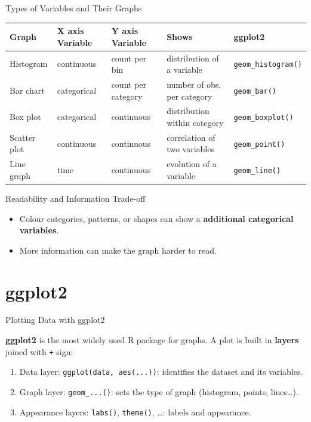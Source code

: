 \documentclass[9pt,aspectratio=169]{beamer}
\begin{document}
\begin{frame}{Types of Variables and Their Graphs}

\begin{center}
\footnotesize
\begin{tabular}{lllll}
\toprule
\textbf{Graph} & \textbf{X axis Variable} & \textbf{Y axis Variable} & \textbf{Shows} & \textbf{ggplot2} \\
\midrule
Histogram    & continuous & count per bin      & distribution of a variable          & \texttt{geom\_histogram()} \\
Bar chart    & categorical         & count per category & number of obs. per category & \texttt{geom\_bar()} \\
Box plot     & categorical         & continuous         & distribution within category   & \texttt{geom\_boxplot()} \\
Scatter plot & continuous          & continuous         & correlation of two variables   & \texttt{geom\_point()} \\
Line graph   & time                & continuous         & evolution of a variable   & \texttt{geom\_line()} \\
\bottomrule
\end{tabular}
\end{center}
\pause
\vspace{0.3cm}
\begin{block}{Readability and Information Trade-off}
  \begin{itemize}
    \item Colour categories, patterns, or shapes can show a \textbf{additional categorical variables}.
    \item More information can make the graph harder to read.
  \end{itemize}
\end{block}
\end{frame}


\section{ggplot2}

\begin{frame}[fragile]{Plotting Data with ggplot2}
\linespread{1.2}\selectfont

\textbf{ggplot2} is the most widely used R package for graphs. A plot is built in \textbf{layers} joined with \texttt{+} sign:
\begin{enumerate}
  \item Data layer: \texttt{ggplot(data, aes(...))}: identifies the dataset and its variables.
  \item Graph layer: \texttt{geom\_...()}: sets the type of graph (histogram, points, lines\dots).
  \item Appearance layers: \texttt{labs()}, \texttt{theme()}, \dots: labels and appearance.
\end{enumerate}
\end{frame}
\end{document}
